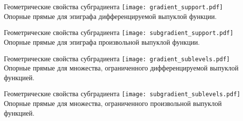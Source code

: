 \documentclass[10pt, handout]{beamer}
\begin{document}
\iffalse
\begin{frame}{Геометрические свойства субградиента}
\only<1-1>{
\centering
\texttt{[image: gradient\_support.pdf]}\\
Опорные прямые для эпиграфа дифференцируемой выпуклой функции.
}
\only<2-2>{
\centering
\texttt{[image: subgradient\_support.pdf]}\\
Опорные прямые для эпиграфа произвольной выпуклой функции.
}
\only<3-3>{
\centering
\texttt{[image: gradient\_sublevels.pdf]}\\
Опорные прямые для множества, ограниченного дифференцируемой выпуклой функцией.
}
\only<4-4>{
\centering
\texttt{[image: subgradient\_sublevels.pdf]}\\
Опорные прямые для множества, ограниченного произвольной выпуклой функцией.
}
\end{frame}
\fi
\begin{frame}{Геометрические свойства субградиента}
\centering
\texttt{[image: gradient\_support.pdf]}\\
Опорные прямые для эпиграфа дифференцируемой выпуклой функции.
\end{frame}
\begin{frame}{Геометрические свойства субградиента}
\centering
\texttt{[image: subgradient\_support.pdf]}\\
Опорные прямые для эпиграфа произвольной выпуклой функции.
\end{frame}
\begin{frame}{Геометрические свойства субградиента}
\centering
\texttt{[image: gradient\_sublevels.pdf]}\\
Опорные прямые для множества, ограниченного дифференцируемой выпуклой функцией.
\end{frame}
\begin{frame}{Геометрические свойства субградиента}
\centering
\texttt{[image: subgradient\_sublevels.pdf]}\\
Опорные прямые для множества, ограниченного произвольной выпуклой функцией.
\end{frame}

\end{document}
